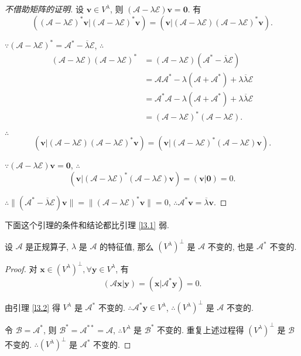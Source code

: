 \documentclass[color=black,device=normal,lang=cn,mode=geye]{elegantnote}
\begin{document}
\begin{proof}[不借助矩阵的证明]
    设 $\boldsymbol{v}\in V^\lambda$, 则 $(\mathcal{A}-\lambda\mathcal{E})\boldsymbol{v}=\boldsymbol{0}$. 有
    \[((\mathcal{A}-\lambda\mathcal{E})^*\boldsymbol{v}|(\mathcal{A}-\lambda\mathcal{E})^*\boldsymbol{v})=(\boldsymbol{v}|(\mathcal{A}-\lambda\mathcal{E})(\mathcal{A}-\lambda\mathcal{E})^*\boldsymbol{v}).\]

    $\because(\mathcal{A}-\lambda\mathcal{E})^*=\mathcal{A}^*-\overline{\lambda}\mathcal{E}$, $\therefore$
    \begin{align*}
        (\mathcal{A}-\lambda\mathcal{E})(\mathcal{A}-\lambda\mathcal{E})^* & =(\mathcal{A}-\lambda\mathcal{E})(\mathcal{A}^*-\overline{\lambda}\mathcal{E}) \\
        & =\mathcal{AA}^*-\lambda(\mathcal{A}+\mathcal{A}^*)+\lambda\overline{\lambda}\mathcal{E} \\
        & =\mathcal{A}^*\mathcal{A}-\lambda(\mathcal{A}+\mathcal{A}^*)+\lambda\overline{\lambda}\mathcal{E} \\
        & =(\mathcal{A}-\lambda\mathcal{E})^*(\mathcal{A}-\lambda\mathcal{E}).
    \end{align*}

    $\therefore$
    \[(\boldsymbol{v}|(\mathcal{A}-\lambda\mathcal{E})(\mathcal{A}-\lambda\mathcal{E})^*\boldsymbol{v})=(\boldsymbol{v}|(\mathcal{A}-\lambda\mathcal{E})^*(\mathcal{A}-\lambda\mathcal{E})\boldsymbol{v}).\]

    $\because(\mathcal{A}-\lambda\mathcal{E})\boldsymbol{v}=\boldsymbol{0}$, $\therefore$
    \[(\boldsymbol{v}|(\mathcal{A}-\lambda\mathcal{E})^*(\mathcal{A}-\lambda\mathcal{E})\boldsymbol{v})=(\boldsymbol{v}|\boldsymbol{0})=0.\]

    $\therefore\|(\mathcal{A}^*-\overline{\lambda}\mathcal{E})\boldsymbol{v}\|=\|(\mathcal{A}-\lambda\mathcal{E})^*\boldsymbol{v}\|=0$, $\therefore\mathcal{A}^*\boldsymbol{v}=\overline{\lambda}\boldsymbol{v}$.
\end{proof}
下面这个引理的条件和结论都比引理 \ref{l3.1} 弱.
\begin{lemma}\label{l3.3}
    设 $\mathcal{A}$ 是正规算子, $\lambda$ 是 $\mathcal{A}$ 的特征值, 那么 $(V^\lambda)^\perp$ 是 $\mathcal{A}$ 不变的, 也是 $\mathcal{A}^*$ 不变的.
\end{lemma}
\begin{proof}
    对 $\boldsymbol{x}\in(V^\lambda)^\perp,\forall\boldsymbol{y}\in V^\lambda$, 有
    \[(\mathcal{A}\boldsymbol{x}|\boldsymbol{y})=(\boldsymbol{x}|\mathcal{A}^*\boldsymbol{y})=0.\]
    
    由引理 \ref{l3.2} 得 $V^\lambda$ 是 $\mathcal{A}^*$ 不变的. $\therefore\mathcal{A}^*\boldsymbol{y}\in V^\lambda$, $\therefore(V^\lambda)^\perp$ 是 $\mathcal{A}$ 不变的.

    令 $\mathcal{B}=\mathcal{A}^*$, 则 $\mathcal{B}^*=\mathcal{A}^{**}=\mathcal{A}$, $\therefore V^\lambda$ 是 $\mathcal{B}^*$ 不变的. 重复上述过程得 $(V^\lambda)^\perp$ 是 $\mathcal{B}$ 不变的. $\therefore(V^\lambda)^\perp$ 是 $\mathcal{A}^*$ 不变的.
\end{proof}
\end{document}
